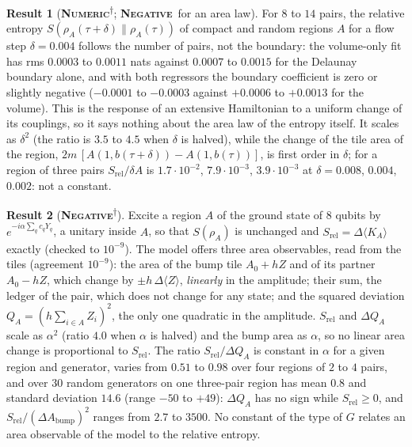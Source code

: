\documentclass[11pt]{article}
\newcommand{\numeric}{\textbf{\textsc{Numeric}}}
\newcommand{\negres}{\textbf{\textsc{Negative}}}
\newcommand{\snap}{\textsuperscript{$\dagger$}}      %
\theoremstyle{definition}
\newtheorem{result}{Result}
\begin{document}
\begin{result}[\numeric\snap; \negres\ for an area law]\label{res:rel-volume}
For $8$ to $14$ pairs, the relative entropy $S(\rho_A(\tau+\delta)\|\rho_A(\tau))$ of compact and random regions $A$ for a flow step $\delta=0.004$ follows the number of pairs, not the boundary: the volume-only fit has rms $0.0003$ to $0.0011$ nats against $0.0007$ to $0.0015$ for the Delaunay boundary alone, and with both regressors the boundary coefficient is zero or slightly negative ($-0.0001$ to $-0.0003$ against $+0.0006$ to $+0.0013$ for the volume). This is the response of an extensive Hamiltonian to a uniform change of its couplings, so it says nothing about the area law of the entropy itself. It scales as $\delta^2$ (the ratio is $3.5$ to $4.5$ when $\delta$ is halved), while the change of the tile area of the region, $2m\,[A(1,b(\tau+\delta))-A(1,b(\tau))]$, is first order in $\delta$; for a region of three pairs $S_{\mathrm{rel}}/\delta A$ is $1.7\cdot10^{-2}$, $7.9\cdot10^{-3}$, $3.9\cdot10^{-3}$ at $\delta=0.008$, $0.004$, $0.002$: not a constant.
\end{result}
\begin{result}[\negres\snap]\label{res:rel-area}
Excite a region $A$ of the ground state of $8$ qubits by $e^{-i\alpha\sum_q c_qY_q}$, a unitary inside $A$, so that $S(\rho_A)$ is unchanged and $S_{\mathrm{rel}}=\Delta\langle K_A\rangle$ exactly (checked to $10^{-9}$). The model offers three area observables, read from the tiles (agreement $10^{-9}$): the area of the bump tile $A_0+hZ$ and of its partner $A_0-hZ$, which change by $\pm h\,\Delta\langle Z\rangle$, \emph{linearly} in the amplitude; their sum, the ledger of the pair, which does not change for any state; and the squared deviation $Q_A=(h\sum_{i\in A}Z_i)^2$, the only one quadratic in the amplitude. $S_{\mathrm{rel}}$ and $\Delta Q_A$ scale as $\alpha^2$ (ratio $4.0$ when $\alpha$ is halved) and the bump area as $\alpha$, so no linear area change is proportional to $S_{\mathrm{rel}}$. The ratio $S_{\mathrm{rel}}/\Delta Q_A$ is constant in $\alpha$ for a given region and generator, varies from $0.51$ to $0.98$ over four regions of $2$ to $4$ pairs, and over $30$ random generators on one three-pair region has mean $0.8$ and standard deviation $14.6$ (range $-50$ to $+49$): $\Delta Q_A$ has no sign while $S_{\mathrm{rel}}\ge0$, and $S_{\mathrm{rel}}/(\Delta A_{\mathrm{bump}})^2$ ranges from $2.7$ to $3500$. No constant of the type of $G$ relates an area observable of the model to the relative entropy.
\end{result}
\end{document}
